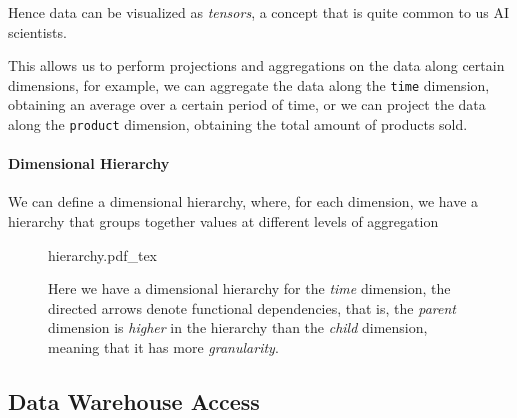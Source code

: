 \documentclass[openright, twoside, twocolumn]{report}
\newcommand{\incsvg}[2]{%
	\def\svgwidth{\columnwidth}
	{#2.pdf_tex}%
}
\begin{document}
Hence data can be visualized as \emph{tensors}, a concept that is
quite common to us AI scientists.

This allows us to perform projections and aggregations on the data
along certain dimensions, for example, we can aggregate
the data along the \texttt{time} dimension, obtaining
an average over a certain period of time, or we can
project the data along the \texttt{product} dimension, obtaining
the total amount of products sold.

\paragraph{Dimensional Hierarchy}

We can define a dimensional hierarchy, where, for each dimension, we
have a hierarchy that groups together values at different
levels of aggregation


\begin{figure}[ht]
	\centering
	\incsvg{fig}{hierarchy}\\
	\label{fig:hierarchy}
	\caption{Here we have a dimensional hierarchy for the
  \emph{time} dimension, the directed arrows denote functional
  dependencies, that is, the \emph{parent} dimension is
  \emph{higher} in the hierarchy than the \emph{child} dimension, meaning
  that it has more \emph{granularity}.}
\end{figure}

\subsection{Data Warehouse Access}

\end{document}
